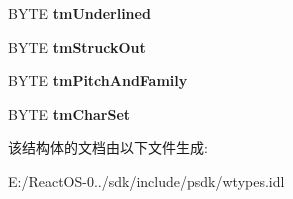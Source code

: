 \begin{DoxyCompactItemize}
B\+Y\+TE {\bfseries tm\+Underlined}
\item 
\mbox{\label{struct_i_win_types_1_1tag_t_e_x_t_m_e_t_r_i_c_w_aa5c16c12881c9571d5459cd2c283564d}} 
B\+Y\+TE {\bfseries tm\+Struck\+Out}
\item 
\mbox{\label{struct_i_win_types_1_1tag_t_e_x_t_m_e_t_r_i_c_w_a32b296933589dd3141d30cab04e035f5}} 
B\+Y\+TE {\bfseries tm\+Pitch\+And\+Family}
\item 
\mbox{\label{struct_i_win_types_1_1tag_t_e_x_t_m_e_t_r_i_c_w_a230f1836f23cc4060b9e77a2293c6a7c}} 
B\+Y\+TE {\bfseries tm\+Char\+Set}
\end{DoxyCompactItemize}


该结构体的文档由以下文件生成\+:\begin{DoxyCompactItemize}
\item 
E\+:/\+React\+O\+S-\/0../sdk/include/psdk/wtypes.\+idl\end{DoxyCompactItemize}

